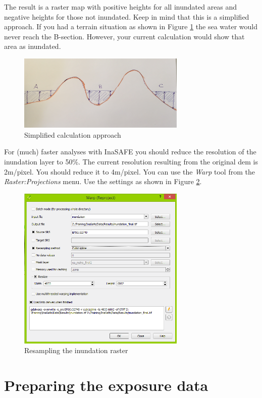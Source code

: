 \documentclass[a4paper,12pt,titlepage]{article}
\begin{document}
The result is a raster map with positive heights for all inundated areas and negative heights for those not inundated. Keep in mind that this is a simplified approach. If you had a terrain situation as shown in Figure \ref{fig:inundation2} the sea water would never reach the B-section. However, your current calculation would show that area as inundated.

\begin{figure}[htb]
	\centering
	\includegraphics[width=8cm]{Images/inundation2.png}
	\caption{Simplified calculation approach}\label{fig:inundation2}
\end{figure}

For (much) faster analyses with InaSAFE you should reduce the resolution of the inundation layer to 50\%. The current resolution resulting from the original \gls{dem} is 2m/pixel. You should reduce it to 4m/pixel. You can use the \textit{Warp} tool from the \textit{Raster:Projections} menu. Use the settings as shown in Figure \ref{fig:warp}.

\begin{figure}[htb]
	\centering
	\includegraphics[width=8cm]{Images/warp.png}
	\caption{Resampling the inundation raster}\label{fig:warp}
\end{figure}


\section{Preparing the exposure data}
\end{document}
